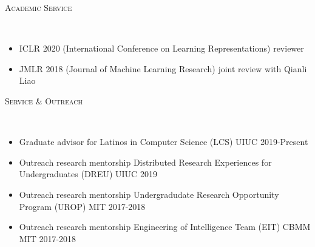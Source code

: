\documentclass{article}
\newenvironment{changemargin}[2]{%
  \begin{list}{}{%
    \setlength{\topsep}{0pt}%
    \setlength{\leftmargin}{#1}%
    \setlength{\rightmargin}{#2}%
    \setlength{\listparindent}{\parindent}%
    \setlength{\itemindent}{\parindent}%
    \setlength{\parsep}{\parskip}%
  }%
  \item[]}{\end{list}
}
\newcommand{\lineover}{
	\begin{changemargin}{-0.05in}{-0.05in}
		\vspace*{-8pt}
		\hrulefill \\
		\vspace*{-2pt}
	\end{changemargin}
}
\newcommand{\header}[1]{
	\begin{changemargin}{-0.5in}{-0.5in}
		\scshape{#1}\\
  	\lineover
	\end{changemargin}
}
\newenvironment{body} {
	\vspace*{-16pt}
	\begin{changemargin}{-0.25in}{-0.5in}
  }	
	{\end{changemargin}
}
\begin{document}
\header{Academic Service}

\begin{body}

\vspace{16pt}
\begin{itemize}
    \item ICLR 2020 (International Conference on Learning Representations) reviewer
    \item JMLR 2018 (Journal of Machine Learning Research) joint review with Qianli Liao
\end{itemize}

\end{body}


\header{Service \& Outreach}

\begin{body}

\vspace{16pt}
\begin{itemize}
    \item Graduate advisor for Latinos in Computer Science (LCS) UIUC 2019-Present
    \item Outreach research mentorship Distributed Research Experiences for Undergraduates (DREU) UIUC 2019
    \item Outreach research mentorship Undergradudate Research Opportunity Program (UROP) MIT 2017-2018 
    \item Outreach research mentorship Engineering of Intelligence Team (EIT) CBMM MIT 2017-2018
\end{itemize}

\end{body}

\newpage

\end{document}
